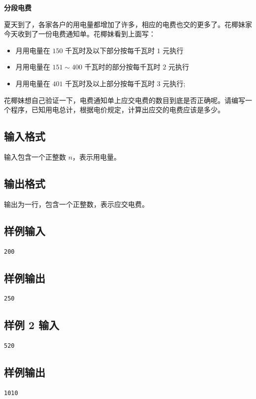 \documentclass{article}
\newcommand{\problemname}[1]{\begin{center}\Large\bfseries #1\end{center}}
\begin{document}
\problemname{分段电费}

夏天到了，各家各户的用电量都增加了许多，相应的电费也交的更多了。花椰妹家今天收到了一份电费通知单。花椰妹看到上面写：

\begin{itemize}
  \item 月用电量在 $150$ 千瓦时及以下部分按每千瓦时 $1$ 元执行

  \item 月用电量在 $151\sim400$ 千瓦时的部分按每千瓦时 $2$ 元执行

  \item 月用电量在 $401$ 千瓦时及以上部分按每千瓦时 $3$ 元执行;

\end{itemize}
花椰妹想自己验证一下，电费通知单上应交电费的数目到底是否正确呢。请编写一个程序，已知用电总计，根据电价规定，计算出应交的电费应该是多少。

\subsection*{输入格式}
输入包含一个正整数 $n$，表示用电量。

\subsection*{输出格式}
输出为一行，包含一个正整数，表示应交电费。

\subsection*{样例输入}
\begin{verbatim}
200
\end{verbatim}

\subsection*{样例输出}
\begin{verbatim}
250
\end{verbatim}

\subsection*{样例 2 输入}
\begin{verbatim}
520
\end{verbatim}

\subsection*{样例输出}
\begin{verbatim}
1010
\end{verbatim}
\end{document}
